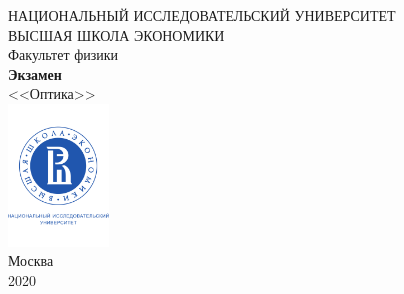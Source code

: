\documentclass[a4paper, 12pt]{article}
\begin{document}
	\begin{titlepage}
		\begin{center}
			$$$$
			$$$$
			$$$$
			$$$$
			{\Large{НАЦИОНАЛЬНЫЙ ИССЛЕДОВАТЕЛЬСКИЙ УНИВЕРСИТЕТ}}\\
			\vspace{0.1cm}
			{\Large{ВЫСШАЯ ШКОЛА ЭКОНОМИКИ}}\\
			\vspace{0.25cm}
			{\large{Факультет физики}}\\
			\vspace{5.5cm}
			{\Huge\textbf{{Экзамен}}}\\%
			\vspace{1cm}
			{\LARGE{<<Оптика>>}}\\%
			\vspace{2cm}
			\vfill
			\includegraphics[width = 0.2\textwidth]{HSElogo}\\
			\vfill
			Москва\\
			2020
		\end{center}
	\end{titlepage}
	
	\tableofcontents
	
	\newpage
	
	
	
	\newpage
	
	
	
	\newpage
	
	
	
	\newpage
	
	
	
	\newpage
	
	
	
	\newpage
	
	
	
	\newpage
	
	
	
	\newpage
	
	
	
	\newpage
	
\end{document}
